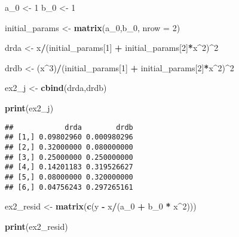 \documentclass[
]{article}
\newenvironment{Shaded}{\begin{snugshade}}{\end{snugshade}}
\newcommand{\DataTypeTok}[1]{\textcolor[rgb]{0.13,0.29,0.53}{#1}}
\newcommand{\DecValTok}[1]{\textcolor[rgb]{0.00,0.00,0.81}{#1}}
\newcommand{\KeywordTok}[1]{\textcolor[rgb]{0.13,0.29,0.53}{\textbf{#1}}}
\newcommand{\NormalTok}[1]{#1}
\newcommand{\OperatorTok}[1]{\textcolor[rgb]{0.81,0.36,0.00}{\textbf{#1}}}
\newcommand{\StringTok}[1]{\textcolor[rgb]{0.31,0.60,0.02}{#1}}
\begin{document}
\begin{Shaded}
\begin{Highlighting}[]
\NormalTok{a\_}\DecValTok{0}\NormalTok{ \textless{}{-}}\StringTok{ }\DecValTok{1}
\NormalTok{b\_}\DecValTok{0}\NormalTok{ \textless{}{-}}\StringTok{ }\DecValTok{1}

\NormalTok{initial\_params \textless{}{-}}\StringTok{ }\KeywordTok{matrix}\NormalTok{(a\_}\DecValTok{0}\NormalTok{,b\_}\DecValTok{0}\NormalTok{, }\DataTypeTok{nrow =} \DecValTok{2}\NormalTok{)}

\NormalTok{drda \textless{}{-}}\StringTok{ }\NormalTok{x}\OperatorTok{/}\NormalTok{(initial\_params[}\DecValTok{1}\NormalTok{] }\OperatorTok{+}\StringTok{ }\NormalTok{initial\_params[}\DecValTok{2}\NormalTok{]}\OperatorTok{*}\NormalTok{x}\OperatorTok{\^{}}\DecValTok{2}\NormalTok{)}\OperatorTok{\^{}}\DecValTok{2}
  
\NormalTok{drdb \textless{}{-}}\StringTok{ }\NormalTok{(x}\OperatorTok{\^{}}\DecValTok{3}\NormalTok{)}\OperatorTok{/}\NormalTok{(initial\_params[}\DecValTok{1}\NormalTok{] }\OperatorTok{+}\StringTok{ }\NormalTok{initial\_params[}\DecValTok{2}\NormalTok{]}\OperatorTok{*}\NormalTok{x}\OperatorTok{\^{}}\DecValTok{2}\NormalTok{)}\OperatorTok{\^{}}\DecValTok{2}


\NormalTok{ex2\_j \textless{}{-}}\StringTok{ }\KeywordTok{cbind}\NormalTok{(drda,drdb)}

\KeywordTok{print}\NormalTok{(ex2\_j)}
\end{Highlighting}
\end{Shaded}

\begin{verbatim}
##            drda        drdb
## [1,] 0.09802960 0.000980296
## [2,] 0.32000000 0.080000000
## [3,] 0.25000000 0.250000000
## [4,] 0.14201183 0.319526627
## [5,] 0.08000000 0.320000000
## [6,] 0.04756243 0.297265161
\end{verbatim}

\begin{Shaded}
\begin{Highlighting}[]
\NormalTok{ex2\_resid \textless{}{-}}\StringTok{ }\KeywordTok{matrix}\NormalTok{(}\KeywordTok{c}\NormalTok{(y }\OperatorTok{{-}}\StringTok{ }\NormalTok{x}\OperatorTok{/}\NormalTok{(a\_}\DecValTok{0} \OperatorTok{+}\StringTok{ }\NormalTok{b\_}\DecValTok{0} \OperatorTok{*}\StringTok{ }\NormalTok{x}\OperatorTok{\^{}}\DecValTok{2}\NormalTok{)))}

\KeywordTok{print}\NormalTok{(ex2\_resid)}
\end{Highlighting}
\end{Shaded}
\end{document}
